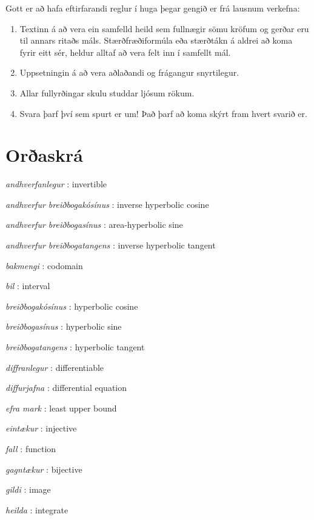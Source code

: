 \documentclass[b5paper,11pt,icelandic]{sphinxmanual}
\begin{document}
Gott er að hafa eftirfarandi reglur í huga þegar gengið er frá lausnum
verkefna:
\begin{enumerate}
\item {} 
Textinn á að vera ein samfelld heild sem fullnægir sömu kröfum og
gerðar eru til annars ritaðs máls. Stærðfræðiformúla eða stærðtákn á
aldrei að koma fyrir eitt sér, heldur alltaf að vera felt inn í samfellt
mál.

\item {} 
Uppsetningin á að vera aðlaðandi og frágangur snyrtilegur.

\item {} 
Allar fullyrðingar skulu studdar ljósum rökum.

\item {} 
Svara þarf því sem spurt er um! Það þarf að koma skýrt fram hvert
svarið er.

\end{enumerate}




\chapter{Orðaskrá}
\label{ordaskra:oraskra}\label{ordaskra::doc}
\emph{andhverfanlegur} : invertible

\emph{andhverfur breiðbogakósínus} : inverse hyperbolic cosine


\emph{andhverfur breiðbogasínus} : area-hyperbolic sine

\emph{andhverfur breiðbogatangens} : inverse hyperbolic tangent


\emph{bakmengi} : codomain

\emph{bil} : interval


\emph{breiðbogakósínus} : hyperbolic cosine


\emph{breiðbogasínus} : hyperbolic sine


\emph{breiðbogatangens} : hyperbolic tangent


\emph{diffranlegur} : differentiable


\emph{diffurjafna} : differential equation


\emph{efra mark} : least upper bound

\emph{eintækur} : injective

\emph{fall} : function


\emph{gagntækur} : bijective

\emph{gildi} : image

\emph{heilda} : integrate
\end{document}
